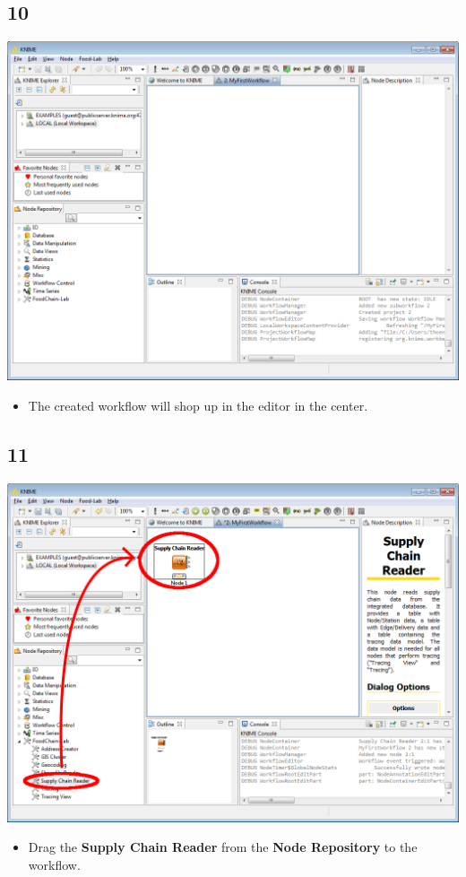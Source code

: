 \documentclass{beamer}
\begin{document}
\subsection{10}
\begin{frame}
	\begin{center}
  		\includegraphics[height=0.6\textheight]{10.png}
	\end{center}
	\begin{itemize}
		\item The created workflow will shop up in the editor in the center.
	\end{itemize}
\end{frame}

\subsection{11}
\begin{frame}
	\begin{center}
  		\includegraphics[height=0.6\textheight]{11.png}
	\end{center}
	\begin{itemize}
		\item Drag the \textbf{Supply Chain Reader} from the \textbf{Node Repository} to the workflow.
	\end{itemize}
\end{frame}
\end{document}
